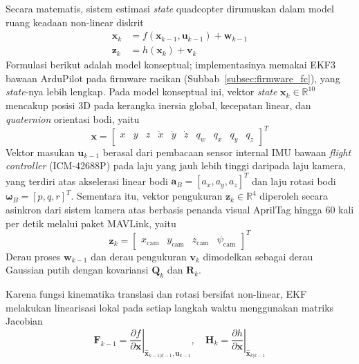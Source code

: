 \documentclass[12pt,a4paper]{report}
\begin{document}
Secara matematis, sistem estimasi \textit{state} quadcopter dirumuskan dalam model ruang keadaan non-linear diskrit \cite{welchIntroductionKalmanFilter2006}
\begin{align}
    \mathbf{x}_k &= f(\mathbf{x}_{k-1}, \mathbf{u}_{k-1}) + \mathbf{w}_{k-1} \label{eq:ekf_system} \\
    \mathbf{z}_k &= h(\mathbf{x}_k) + \mathbf{v}_k \label{eq:ekf_measurement}
\end{align}
Formulasi berikut adalah model konseptual; implementasinya memakai EKF3 bawaan ArduPilot pada firmware racikan (Subbab~\ref{subsec:firmware_fc}), yang \textit{state}-nya lebih lengkap. Pada model konseptual ini, vektor \textit{state} $\mathbf{x}_k \in \mathbb{R}^{10}$ mencakup posisi 3D pada kerangka inersia global, kecepatan linear, dan \textit{quaternion} orientasi bodi, yaitu
\begin{equation}
    \mathbf{x} = 
    \begin{bmatrix}
        x & y & z & \dot{x} & \dot{y} & \dot{z} & q_w & q_x & q_y & q_z
    \end{bmatrix}^T
    \label{eq:state_vector_ekf}
\end{equation}
Vektor masukan $\mathbf{u}_{k-1}$ berasal dari pembacaan sensor internal IMU bawaan \textit{flight controller} (ICM-42688P) pada laju yang jauh lebih tinggi daripada laju kamera, yang terdiri atas akselerasi linear bodi $\mathbf{a}_B = [a_x, a_y, a_z]^T$ dan laju rotasi bodi $\boldsymbol{\omega}_B = [p, q, r]^T$. Sementara itu, vektor pengukuran $\mathbf{z}_k \in \mathbb{R}^4$ diperoleh secara asinkron dari sistem kamera atas berbasis penanda visual AprilTag hingga $60$ kali per detik melalui paket MAVLink, yaitu
\begin{equation}
    \mathbf{z}_k = 
    \begin{bmatrix}
        x_{\mathrm{cam}} & y_{\mathrm{cam}} & z_{\mathrm{cam}} & \psi_{\mathrm{cam}}
    \end{bmatrix}^T
    \label{eq:measurement_vector_ekf}
\end{equation}
Derau proses $\mathbf{w}_{k-1}$ dan derau pengukuran $\mathbf{v}_k$ dimodelkan sebagai derau Gaussian putih dengan kovariansi $\mathbf{Q}_k$ dan $\mathbf{R}_k$.

Karena fungsi kinematika translasi dan rotasi bersifat non-linear, EKF melakukan linearisasi lokal pada setiap langkah waktu menggunakan matriks Jacobian \cite{gelbAppliedOptimalEstimation1974}
\begin{equation}
    \mathbf{F}_{k-1} = \left. \frac{\partial f}{\partial \mathbf{x}} \right|_{\hat{\mathbf{x}}_{k-1|k-1}, \mathbf{u}_{k-1}}, \quad \mathbf{H}_k = \left. \frac{\partial h}{\partial \mathbf{x}} \right|_{\hat{\mathbf{x}}_{k|k-1}}
\end{equation}
\end{document}
